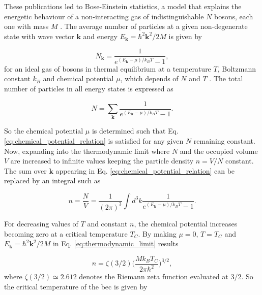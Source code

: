 These publications led to Bose-Einstein statistics, a model that explains the energetic behaviour of a non-interacting gas of indistinguishable $N$ bosons, each one with mass $M$ \cite{Masahito2010, Pethick2008}. The average number of particles at a given non-degenerate state with wave vector $\mathbf{k}$ and energy $E_\mathbf{k} = \hbar^2 \mathbf{k}^2 / 2M$ is given by

\begin{equation}\label{eq:bose-einstein_distribution}
	\bar{N}_{\mathbf{k}} = \frac{1}{e^{(E_\mathbf{k} - \mu)/k_B T} - 1},
\end{equation}
for an ideal gas of bosons in thermal equilibrium at a temperature $T$, Boltzmann constant $k_B$ and chemical potential $\mu$, which depends of $N$ and $T$ \cite{Masahito2010}. The total number of particles in all energy states is expressed as

\begin{equation}\label{eq:chemical_potential_relation}
N = \sum_{\mathbf{k}}\frac{1}{e^{(E_\mathbf{k} - \mu)/k_B T} - 1}.
\end{equation}

So the chemical potential $\mu$ is determined such that Eq. \eqref{eq:chemical_potential_relation} is satisfied for any given $N$ remaining constant. Now, expanding into the thermodynamic limit where $N$ and the occupied volume $V$ are increased to infinite values keeping the particle density $n = V/N$ constant. The sum over $\mathbf{k}$ appearing in Eq. \eqref{eq:chemical_potential_relation} can be replaced by an integral such as

\begin{equation}\label{eq:thermodynamic_limit}
n = \frac{N}{V} =  \frac{1}{(2\pi)^3}\int d^3 k\frac{1}{e^{(E_\mathbf{k} - \mu)/k_B T} - 1}.
\end{equation}

For decreasing values of $T$ and constant $n$, the chemical potential increases becoming zero at a critical temperature $T_C$. By making $\mu = 0$, $T = T_C$ and $E_\mathbf{k} = \hbar^2 \mathbf{k}^2 / 2M$ in Eq. \eqref{eq:thermodynamic_limit} results

\begin{equation}\label{eq:thermodynamic_limit_at_critical_conditions}
n =  \zeta(3/2) \bigg(\frac{M k_B T_C}{2 \pi \hbar^2}\bigg)^{3/2},
\end{equation}
where $\zeta(3/2) \simeq 2.612$ denotes the Riemann zeta function evaluated at 3/2. So the critical temperature of the \ac{bec} is given by

